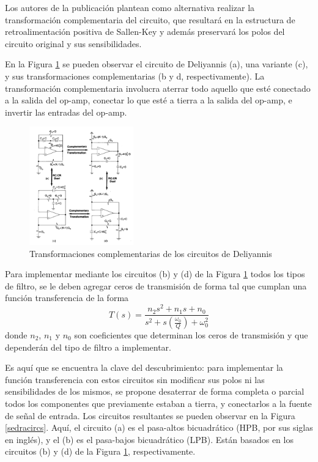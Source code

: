 Los autores de la publicación plantean como alternativa realizar la transformación complementaria del circuito, que resultará en la estructura de retroalimentación positiva de Sallen-Key y además preservará los polos del circuito original y sus sensibilidades.

En la Figura \ref{salkey} se pueden observar el circuito de Deliyannis (a), una variante (c), y sus transformaciones complementarias (b y d, respectivamente). La transformación complementaria involucra aterrar todo aquello que esté conectado a la salida del op-amp, conectar lo que esté a tierra a la salida del op-amp, e invertir las entradas del op-amp.

\begin{figure}[H]
\begin{centering}
\includegraphics[width=0.4\textwidth]{../Ex3/Resources/sallenkeystructures.png}
\par\end{centering}
\caption{Transformaciones complementarias de los circuitos de Deliyannis}
\label{salkey}
\end{figure}

Para implementar mediante los circuitos (b) y (d) de la Figura \ref{salkey} todos los tipos de filtro, se le deben agregar ceros de transmisión de forma tal que cumplan una función transferencia de la forma 
\begin{equation*}
    T(s)=\frac{n_{2}s^2+n_{1}s+n_{0}}{s^2+s(\frac{\omega_{0}}{Q})+\omega_{0}^2}
\end{equation*}
donde $n_{2}$, $n_{1}$ y $n_{0}$ son coeficientes que determinan los ceros de transmisión y que dependerán del tipo de filtro a implementar.

Es aquí que se encuentra la clave del descubrimiento: para implementar la función transferencia con estos circuitos sin modificar sus polos ni las sensibilidades de los mismos, se propone desaterrar de forma completa o parcial todos los componentes que previamente estaban a tierra, y conectarlos a la fuente de señal de entrada. Los circuitos resultantes se pueden observar en la Figura \ref{sedracircs}. Aquí, el circuito (a) es el pasa-altos bicuadrático (HPB, por sus siglas en inglés), y el (b) es el pasa-bajos bicuadrático (LPB). Están basados en los circuitos (b) y (d) de la Figura \ref{salkey}, respectivamente.


